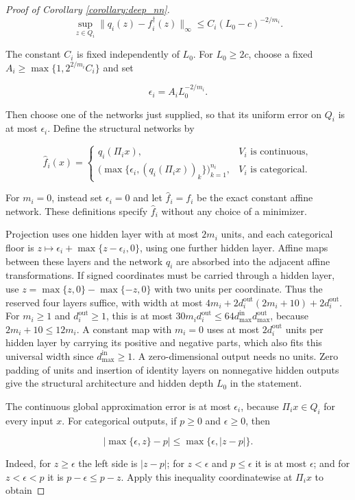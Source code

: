 \begin{proof}[Proof of Corollary \ref{corollary:deep_nn}]
\[
\sup_{z\in Q_i}\|q_i(z)-f_i^\dagger(z)\|_\infty\leqslant C_i(L_0-c)^{-2/m_i}.
\]

The constant $C_i$ is fixed independently of $L_0$. For $L_0\geqslant2c$, choose a fixed $A_i\geqslant\max\{1,2^{2/m_i}C_i\}$ and set

\[
\epsilon_i=A_iL_0^{-2/m_i}.
\]

Then choose one of the networks just supplied, so that its uniform error on $Q_i$ is at most $\epsilon_i$. Define the structural networks by

\[
\hat f_i(x)=
\begin{cases}
q_i(\Pi_i x),&V_i\text{ is continuous},\\
\bigl(\max\{\epsilon_i,(q_i(\Pi_i x))_k\}\bigr)_{k=1}^{n_i},&V_i\text{ is categorical}.
\end{cases}
\]

For $m_i=0$, instead set $\epsilon_i=0$ and let $\hat f_i=f_i$ be the exact constant affine network. These definitions specify $\hat f_i$ without any choice of a minimizer. 

Projection uses one hidden layer with at most $2m_i$ units, and each categorical floor is $z\mapsto\epsilon_i+\max\{z-\epsilon_i,0\}$, using one further hidden layer. Affine maps between these layers and the network $q_i$ are absorbed into the adjacent affine transformations. If signed coordinates must be carried through a hidden layer, use $z=\max\{z,0\}-\max\{-z,0\}$ with two units per coordinate. Thus the reserved four layers suffice, with width at most $4m_i+2d_i^{\text{out}}(2m_i+10)+2d_i^{\text{out}}$. For $m_i\geqslant1$ and $d_i^{\text{out}}\geqslant1$, this is at most $30m_i d_i^{\text{out}}\leqslant64d_{\max}^{\text{in}}d_{\max}^{\text{out}}$, because $2m_i+10\leqslant12m_i$. A constant map with $m_i=0$ uses at most $2d_i^{\text{out}}$ units per hidden layer by carrying its positive and negative parts, which also fits this universal width since $d_{\max}^{\text{in}}\geqslant1$. A zero-dimensional output needs no units. Zero padding of units and insertion of identity layers on nonnegative hidden outputs give the structural architecture and hidden depth $L_0$ in the statement. 

The continuous global approximation error is at most $\epsilon_i$, because $\Pi_i x\in Q_i$ for every input $x$. For categorical outputs, if $p\geqslant0$ and $\epsilon\geqslant0$, then

\[
|\max\{\epsilon,z\}-p|\leqslant\max\{\epsilon,|z-p|\}.
\]

Indeed, for $z\geqslant\epsilon$ the left side is $|z-p|$; for $z<\epsilon$ and $p\leqslant\epsilon$ it is at most $\epsilon$; and for $z<\epsilon<p$ it is $p-\epsilon\leqslant p-z$. Apply this inequality coordinatewise at $\Pi_i x$ to obtain


\end{proof}
